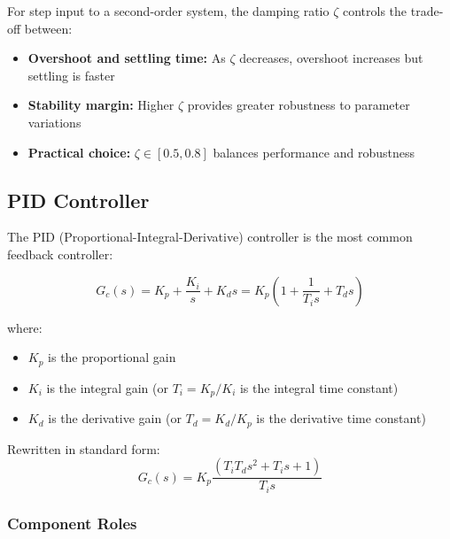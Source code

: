 \begin{keyconceptbox}[title=Design Trade-offs]
For step input to a second-order system, the damping ratio $\zeta$ controls the trade-off between:
\begin{itemize}
    \item \textbf{Overshoot and settling time:} As $\zeta$ decreases, overshoot increases but settling is faster
    \item \textbf{Stability margin:} Higher $\zeta$ provides greater robustness to parameter variations
    \item \textbf{Practical choice:} $\zeta \in [0.5, 0.8]$ balances performance and robustness
\end{itemize}
\end{keyconceptbox}

\subsection{PID Controller}
\label{subsec:pid_controller}

The PID (Proportional-Integral-Derivative) controller is the most common feedback controller:

\begin{equation}
    G_c(s) = K_p + \frac{K_i}{s} + K_d s = K_p \left(1 + \frac{1}{T_i s} + T_d s\right)
\end{equation}

\noindent where:
\begin{itemize}
    \item $K_p$ is the proportional gain
    \item $K_i$ is the integral gain (or $T_i = K_p/K_i$ is the integral time constant)
    \item $K_d$ is the derivative gain (or $T_d = K_d/K_p$ is the derivative time constant)
\end{itemize}

Rewritten in standard form:
\begin{equation}
    G_c(s) = K_p \frac{(T_i T_d s^2 + T_i s + 1)}{T_i s}
\end{equation}

\subsubsection{Component Roles}

